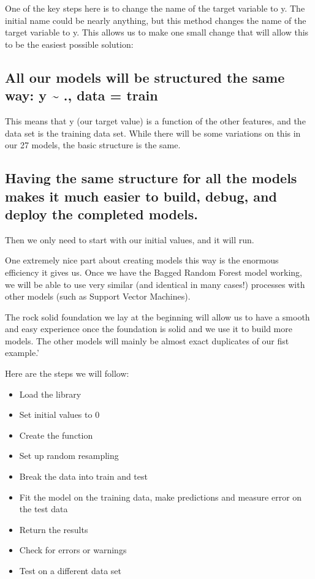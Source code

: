 \documentclass[
]{book}
\begin{document}
One of the key steps here is to change the name of the target variable
to y. The initial name could be nearly anything, but this method changes
the name of the target variable to y. This allows us to make one small
change that will allow this to be the easiest possible solution:

\subsection{All our models will be structured the same way: y \textasciitilde{} ., data = train}\label{all-our-models-will-be-structured-the-same-way-y-.-data-train}

This means that y (our target value) is a function of the other
features, and the data set is the training data set. While there will be
some variations on this in our 27 models, the basic structure is the
same.

\subsection{Having the same structure for all the models makes it much easier to build, debug, and deploy the completed models.}\label{having-the-same-structure-for-all-the-models-makes-it-much-easier-to-build-debug-and-deploy-the-completed-models.}

Then we only need to start with our initial values, and it will run.

One extremely nice part about creating models this way is the enormous
efficiency it gives us. Once we have the Bagged Random Forest model
working, we will be able to use very similar (and identical in many
cases!) processes with other models (such as Support Vector Machines).

The rock solid foundation we lay at the beginning will allow us to have
a smooth and easy experience once the foundation is solid and we use it
to build more models. The other models will mainly be almost exact
duplicates of our fist example.'

Here are the steps we will follow:

\begin{itemize}
\item
  Load the library
\item
  Set initial values to 0
\item
  Create the function
\item
  Set up random resampling
\item
  Break the data into train and test
\item
  Fit the model on the training data, make predictions and measure
  error on the test data
\item
  Return the results
\item
  Check for errors or warnings
\item
  Test on a different data set
\end{itemize}
\end{document}
